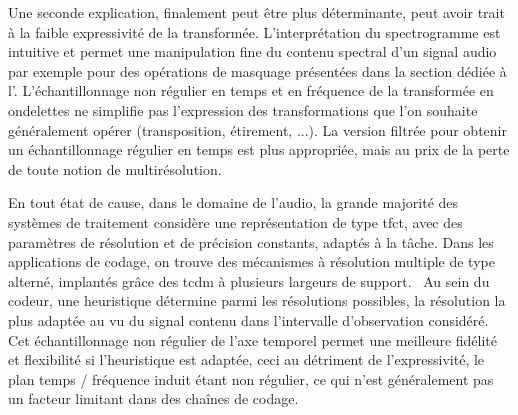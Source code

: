 Une seconde explication, finalement peut être plus déterminante, peut avoir trait à la faible expressivité de la transformée. L'interprétation  du spectrogramme est intuitive et permet une manipulation fine du contenu spectral d'un signal audio par exemple pour des opérations de masquage présentées dans la section dédiée à l'. L'échantillonnage non régulier en temps et en fréquence de la transformée en ondelettes ne simplifie pas l'expression des transformations que l'on souhaite généralement opérer (transposition, étirement, ...). La version filtrée pour obtenir un échantillonnage régulier en temps est plus appropriée, mais au prix de la perte de toute notion de multirésolution.




En tout état de cause, dans le domaine de l'audio, la grande majorité des systèmes de traitement considère une représentation de type tfct, avec des paramètres de résolution et de précision constants, adaptés à la tâche. Dans les applications de codage, on trouve des mécanismes à résolution multiple de type alterné, implantés grâce des tcdm à plusieurs largeurs de support.~\cite{brandenburg1999mp3} Au sein du codeur, une heuristique détermine parmi les résolutions possibles, la résolution la plus adaptée au vu du signal contenu dans l'intervalle d'observation considéré. Cet échantillonnage non régulier de l'axe temporel permet une meilleure fidélité et flexibilité si l'heuristique est adaptée, ceci au détriment de l'expressivité, le plan temps / fréquence induit étant non régulier, ce qui n'est généralement pas un facteur limitant dans des chaînes de codage.

